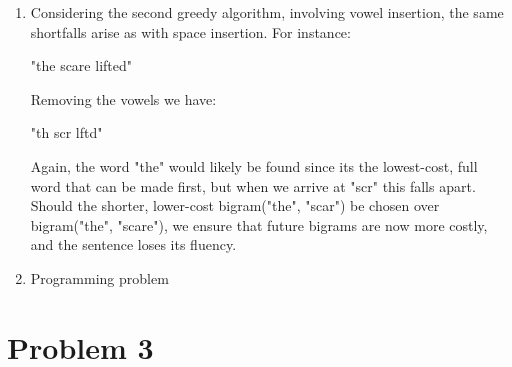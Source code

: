 \documentclass[12pt]{article}
\begin{document}
\begin{enumerate}[label=(\alph*)]
	\item Considering the second greedy algorithm, involving vowel insertion,
		the same shortfalls arise as with space insertion. For instance:

		"the scare lifted"

		Removing the vowels we have:
		
		"th scr lftd"

		Again, the word "the" would likely be found since its the lowest-cost,
		full word that can be made first, but when we arrive at "scr" this falls apart.
		Should the shorter, lower-cost bigram("the", "scar") be chosen over
		bigram("the", "scare"), we ensure that future bigrams are now more costly,
		and the sentence loses its fluency.
	
	\item Programming problem

\end{enumerate}

\section*{Problem 3}
\end{document}
